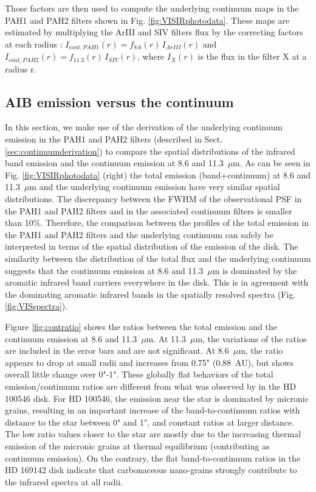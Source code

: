 \documentclass{aa}
\newcommand{\mic}{~$\mu$m\xspace}
\begin{document}
Those factors are then used to compute the underlying continuum maps in the PAH1 and PAH2 filters shown in Fig. \ref{fig:VISIRphotodata}. These maps are estimated by multiplying the ArIII and SIV filters flux by the correcting factors at each radius : $I_{cont, PAH1}(r) = f_{8.6}(r)\,I_{ArIII}(r)$ and $I_{cont, PAH2}(r) = f_{11.3}(r)\,I_{SIV}(r)$, where $I_{X}(r)$ is the flux in the filter X at a radius r.


\subsection{AIB emission versus the continuum}
In this section, we make use of the derivation of the underlying continuum emission in the PAH1 and PAH2 filters (described in Sect. \ref{sec:continuumderivation}) to compare the spatial distributions of the infrared band emission and the continuum emission at 8.6 and 11.3\mic.
As can be seen in Fig. \ref{fig:VISIRphotodata} (right) the total emission (band+continuum) at 8.6 and 11.3\mic and the underlying continuum emission have very similar spatial distributions. The discrepancy between the FWHM of the observational PSF in the PAH1 and PAH2 filters and in the associated continuum filters is smaller than 10\%. Therefore, the comparison between the profiles of the total emission in the PAH1 and PAH2 filters and the underlying continuum can safely be interpreted in terms of the spatial distribution of the emission of the disk. The similarity between the distribution of the total flux and the underlying continuum suggests that the continuum emission at 8.6 and 11.3\mic is dominated by the aromatic infrared band carriers everywhere in the disk. This is in agreement with the dominating aromatic infrared bands in the spatially resolved spectra (Fig. \ref{fig:VISspectra}).

Figure \ref{fig:contratio} shows the ratios between the total emission and the continuum emission at 8.6 and 11.3\mic. At 11.3\mic, the variations of the ratios are included in the error bars and are not significant. At 8.6\mic, the ratio appears to drop at small radii and increases from 0.75" (0.88~AU), but shows overall little change over 0"-1". These globally flat behaviors of the total emission/continuum ratios are different from what was observed by \citet{Habart2021} in the HD 100546 disk. For HD 100546, the emission near the star is dominated by micronic grains, resulting in an important increase of the band-to-continuum ratios with distance to the star between 0" and 1", and constant ratios at larger distance. The low ratio values closer to the star are mostly due to the increasing thermal emission of the micronic grains at thermal equilibrium (contributing as continuum emission).
On the contrary, the flat band-to-continuum ratios in the HD 169142 disk indicate that carbonaceous nano-grains strongly contribute to the infrared spectra at all radii.
\end{document}

